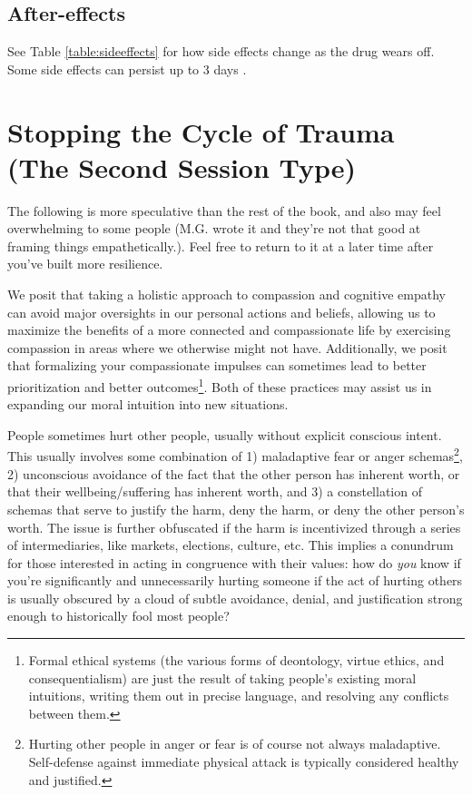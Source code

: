 \documentclass[12pt,letterpaper]{book}
\begin{document}
\subsection*{After-effects}
See Table \ref{table:sideeffects} for how side effects change as the drug wears off. Some side effects can persist up to 3 days \cite{liechtiGender}.
\section{Stopping the Cycle of Trauma (The Second Session Type)}
\label{stopcycle}
The following is more speculative than the rest of the book, and also may feel overwhelming to some people (M.G. wrote it and they're not that good at framing things empathetically.). Feel free to return to it at a later time after you’ve built more resilience.

We posit that taking a holistic approach to compassion and cognitive empathy can avoid major oversights in our personal actions and beliefs, allowing us to maximize the benefits of a more connected and compassionate life by exercising compassion in areas where we otherwise might not have. Additionally, we posit that formalizing your compassionate impulses can sometimes lead to better prioritization and better outcomes\footnote{Formal ethical systems (the various forms of deontology, virtue ethics, and consequentialism) are just the result of taking people's existing moral intuitions, writing them out in precise language, and resolving any conflicts between them.}. Both of these practices may assist us in expanding our moral intuition into new situations.

People sometimes hurt other people, usually without explicit conscious intent. This usually involves some combination of 1) maladaptive fear or anger schemas\footnote{Hurting other people in anger or fear is of course not always maladaptive. Self-defense against immediate physical attack is typically considered healthy and justified.}, 2) unconscious avoidance of the fact that the other person has inherent worth, or that their wellbeing/suffering has inherent worth, and 3) a constellation of schemas that serve to justify the harm, deny the harm, or deny the other person's worth. The issue is further obfuscated if the harm is incentivized through a series of intermediaries, like markets, elections, culture, etc. This implies a conundrum for those interested in acting in congruence with their values: how do \textit{you} know if you're significantly and unnecessarily hurting someone if the act of hurting others is usually obscured by a cloud of subtle avoidance, denial, and justification strong enough to historically fool most people?
\end{document}
